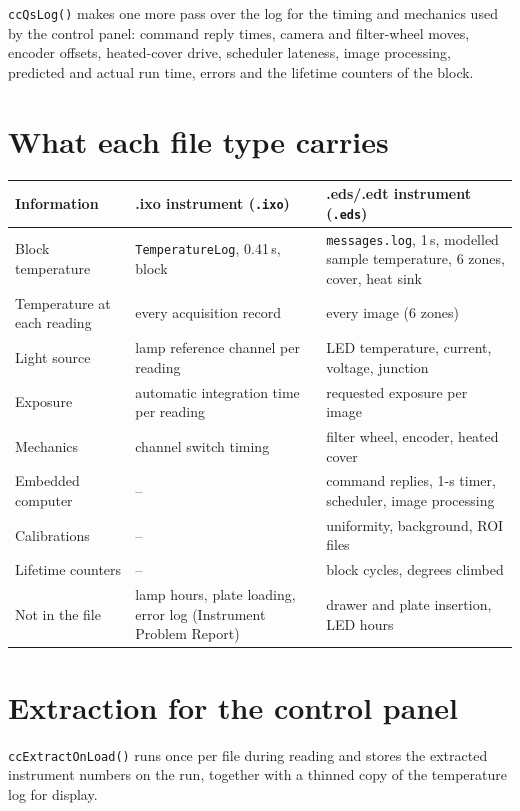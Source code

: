 \texttt{ccQsLog()} makes one more pass over the log for the timing and mechanics used by the control panel: command reply times,
camera and filter-wheel moves, encoder offsets, heated-cover drive, scheduler lateness, image processing, predicted and actual
run time, errors and the lifetime counters of the block.



\section{What each file type carries}
\begin{center}\small
\begin{tabular}{@{}p{4.6cm}p{4.9cm}p{5.6cm}@{}}\toprule
Information & .ixo instrument (\texttt{.ixo}) & .eds/.edt instrument (\texttt{.eds})\\\midrule
Block temperature & \texttt{TemperatureLog}, 0.41\,s, block & \texttt{messages.log}, 1\,s, modelled sample temperature, 6 zones, cover, heat sink\\
Temperature at each reading & every acquisition record & every image (6 zones)\\
Light source & lamp reference channel per reading & LED temperature, current, voltage, junction\\
Exposure & automatic integration time per reading & requested exposure per image\\
Mechanics & channel switch timing & filter wheel, encoder, heated cover\\
Embedded computer & -- & command replies, 1-s timer, scheduler, image processing\\
Calibrations & -- & uniformity, background, ROI files\\
Lifetime counters & -- & block cycles, degrees climbed\\
Not in the file & lamp hours, plate loading, error log (Instrument Problem Report) & drawer and plate insertion, LED hours\\\bottomrule
\end{tabular}
\end{center}

\section{Extraction for the control panel}
\texttt{ccExtractOnLoad()} runs once per file during reading and stores the extracted instrument numbers on the run, together
with a thinned copy of the temperature log for display.




